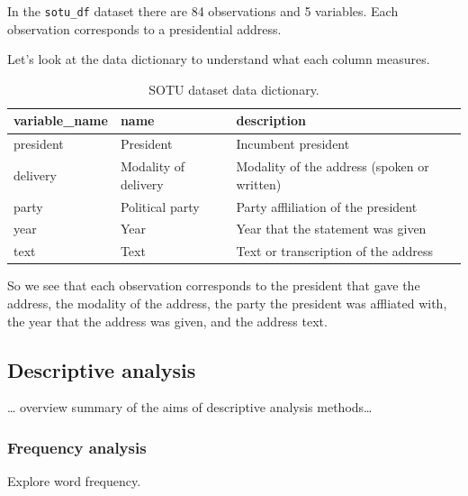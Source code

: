 \documentclass[
]{article}
\begin{document}
In the \texttt{sotu\_df} dataset there are 84 observations and 5 variables. Each observation corresponds to a presidential address.

Let's look at the data dictionary to understand what each column measures.

\begin{table}

\caption{\label{tab:eda-sotu-data-dictionary-preview}SOTU dataset data dictionary.}
\centering
\begin{tabular}[t]{lll}
\toprule
variable\_name & name & description\\
\midrule
president & President & Incumbent president\\
delivery & Modality of delivery & Modality of the address (spoken or written)\\
party & Political party & Party affliliation of the president\\
year & Year & Year that the statement was given\\
text & Text & Text or transcription of the address\\
\bottomrule
\end{tabular}
\end{table}

So we see that each observation corresponds to the president that gave the address, the modality of the address, the party the president was affliated with, the year that the address was given, and the address text.

\hypertarget{descriptive-analysis}{%
\subsection{Descriptive analysis}\label{descriptive-analysis}}

\ldots{} overview summary of the aims of descriptive analysis methods\ldots{}

\hypertarget{frequency-analysis}{%
\subsubsection{Frequency analysis}\label{frequency-analysis}}

Explore word frequency.
\end{document}
